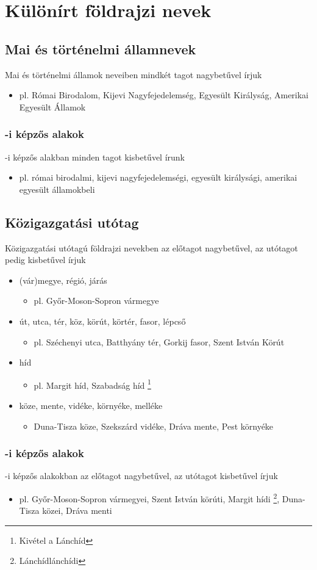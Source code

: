 \documentclass{article}
\begin{document}
\section{Különírt földrajzi nevek}
\subsection{Mai és történelmi államnevek}
Mai és történelmi államok neveiben mindkét tagot nagybetűvel írjuk
\begin{itemize}
    \item pl. Római Birodalom, Kijevi Nagyfejedelemség, Egyesült Királyság, Amerikai Egyesült Államok
\end{itemize}

\subsubsection{-i képzős alakok}
-i képzős alakban minden tagot kisbetűvel írunk
\begin{itemize}
    \item pl. római birodalmi, kijevi nagyfejedelemségi, egyesült királysági, amerikai egyesült államokbeli
\end{itemize}

\subsection{Közigazgatási utótag}
Közigazgatási utótagú földrajzi nevekben az előtagot nagybetűvel, az utótagot pedig kisbetűvel írjuk

\begin{itemize}
    \item (vár)megye, régió, járás
    \begin{itemize}
        \item   pl. Győr-Moson-Sopron vármegye
    \end{itemize}
    \item út, utca, tér, köz, körút, körtér, fasor, lépcső
    \begin{itemize}
        \item pl. Széchenyi utca, Batthyány tér, Gorkij fasor, Szent István Körút
    \end{itemize}
    \item híd
    \begin{itemize}
        \item pl. Margit híd, Szabadság híd \footnote{Kivétel a Lánchíd}
    \end{itemize}
    \item köze, mente, vidéke, környéke, melléke
    \begin{itemize}
        \item Duna-Tisza köze, Szekszárd vidéke, Dráva mente, Pest környéke
    \end{itemize}
\end{itemize}

\subsubsection{-i képzős alakok}
-i képzős alakokban az előtagot nagybetűvel, az utótagot kisbetűvel írjuk
\begin{itemize}
    \item pl. Győr-Moson-Sopron vármegyei, Szent István körúti, Margit hídi \footnote{Lánchíd\textrightarrow lánchídi}, Duna-Tisza közei, Dráva menti
\end{itemize}
\end{document}
